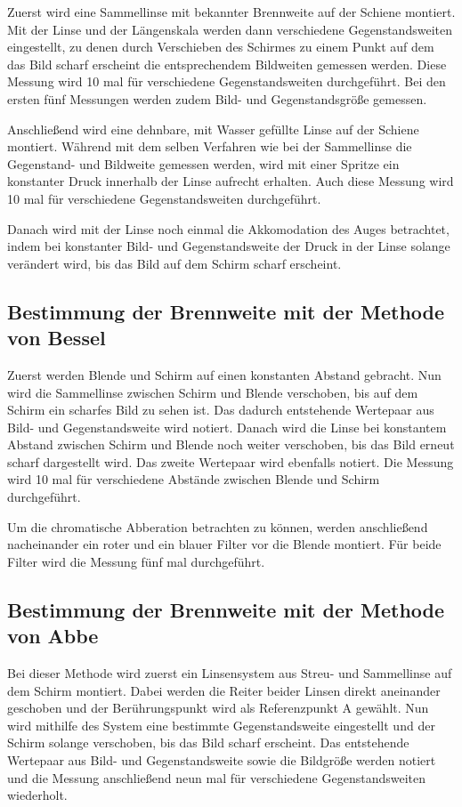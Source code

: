 Zuerst wird eine Sammellinse mit bekannter Brennweite auf der Schiene montiert.
Mit der Linse und der
Längenskala werden dann verschiedene Gegenstandsweiten eingestellt, zu denen
durch Verschieben des Schirmes zu einem Punkt auf dem das Bild scharf erscheint
die entsprechendem Bildweiten gemessen werden. Diese Messung wird 10 mal für
verschiedene Gegenstandsweiten durchgeführt.
Bei den ersten fünf Messungen werden zudem Bild- und Gegenstandsgröße gemessen.

Anschließend wird eine dehnbare, mit Wasser gefüllte Linse auf der Schiene montiert.
Während mit dem selben Verfahren wie bei der Sammellinse die Gegenstand- und Bildweite
gemessen werden, wird mit einer Spritze ein konstanter Druck innerhalb der
Linse aufrecht erhalten. Auch diese Messung wird 10 mal für verschiedene
Gegenstandsweiten durchgeführt.

Danach wird mit der Linse noch einmal die Akkomodation des Auges betrachtet, indem
bei konstanter Bild- und Gegenstandsweite der Druck in der Linse solange verändert
wird, bis das Bild auf dem Schirm scharf erscheint.

\subsection{Bestimmung der Brennweite mit der Methode von Bessel}

Zuerst werden Blende und Schirm auf einen konstanten Abstand gebracht. Nun
wird die Sammellinse zwischen Schirm und Blende verschoben, bis auf dem Schirm
ein scharfes Bild zu sehen ist. Das dadurch entstehende Wertepaar aus Bild-
und Gegenstandsweite wird notiert. Danach wird die Linse bei konstantem Abstand
zwischen Schirm und Blende noch weiter verschoben, bis das Bild erneut scharf
dargestellt wird. Das zweite Wertepaar wird ebenfalls notiert. Die Messung
wird 10 mal für verschiedene Abstände zwischen Blende und Schirm durchgeführt.

Um die chromatische Abberation betrachten zu können, werden
anschließend nacheinander ein roter und ein blauer Filter vor die
Blende montiert. Für beide Filter wird die Messung fünf mal durchgeführt.

\subsection{Bestimmung der Brennweite mit der Methode von Abbe}

Bei dieser Methode wird zuerst ein Linsensystem aus Streu- und Sammellinse auf
dem Schirm montiert. Dabei werden die Reiter beider Linsen direkt aneinander
geschoben und der Berührungspunkt wird als Referenzpunkt A gewählt. Nun wird
mithilfe des System eine bestimmte Gegenstandsweite eingestellt und der Schirm
solange verschoben, bis das Bild scharf erscheint. Das entstehende Wertepaar aus
Bild- und Gegenstandsweite sowie die Bildgröße werden notiert und die Messung
anschließend neun mal für verschiedene Gegenstandsweiten wiederholt.

\printbibliography


